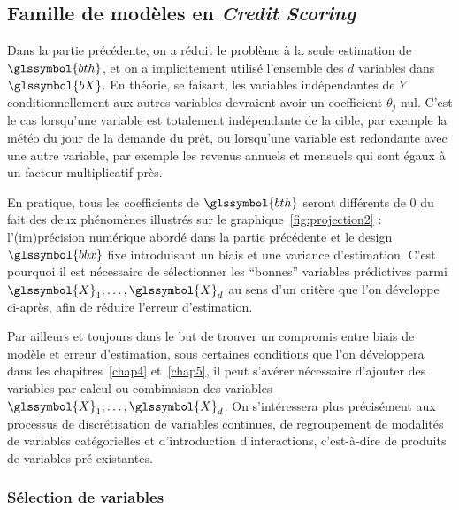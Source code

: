 \subsection{Famille de modèles en \textit{Credit Scoring}}

Dans la partie précédente, on a réduit le problème à la seule estimation de $\glssymbol{bth}$, et on a implicitement utilisé l'ensemble des $d$ variables dans $\glssymbol{bX}$. En théorie, se faisant, les variables indépendantes de $Y$ conditionnellement aux autres variables devraient avoir un coefficient $\theta_j$ nul. C'est le cas lorsqu'une variable est totalement indépendante de la cible, par exemple la météo du jour de la demande du prêt, ou lorsqu'une variable est redondante avec une autre variable, par exemple les revenus annuels et mensuels qui sont égaux à un facteur multiplicatif près.

En pratique, tous les coefficients de $\glssymbol{bth}$ seront différents de $0$ du fait des deux phénomènes illustrés sur le graphique~\ref{fig:projection2} : l'(im)précision numérique abordé dans la partie précédente et le design $\glssymbol{bbx}$ fixe introduisant un biais et une variance d'estimation. C'est pourquoi il est nécessaire de sélectionner les ``bonnes'' variables prédictives parmi $\glssymbol{X}_1,\dots,\glssymbol{X}_d$ au sens d'un critère que l'on développe ci-après, afin de réduire l'erreur d'estimation.

Par ailleurs et toujours dans le but de trouver un compromis entre biais de modèle et erreur d'estimation, sous certaines conditions que l'on développera dans les chapitres~\ref{chap4} et~\ref{chap5}, il peut s'avérer nécessaire d'ajouter des variables par calcul ou combinaison des variables $\glssymbol{X}_1,\dots,\glssymbol{X}_d$. On s'intéressera plus précisément aux processus de discrétisation de variables continues, de regroupement de modalités de variables catégorielles et d'introduction d'interactions, c'est-à-dire de produits de variables pré-existantes. 

\subsubsection{Sélection de variables} \label{subsubsec:selection}

